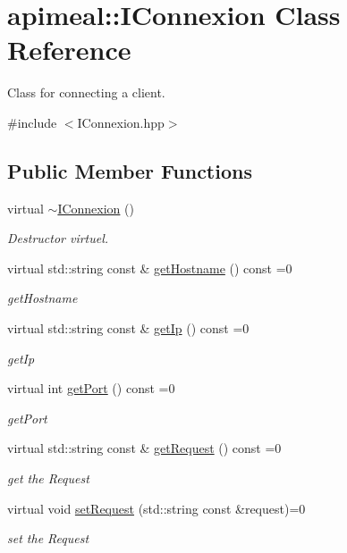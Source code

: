 \hypertarget{classapimeal_1_1IConnexion}{\section{apimeal\-:\-:I\-Connexion Class Reference}
\label{classapimeal_1_1IConnexion}
}


Class for connecting a client.  




{\ttfamily \#include $<$I\-Connexion.\-hpp$>$}

\subsection*{Public Member Functions}
\begin{DoxyCompactItemize}
\item 
\hypertarget{classapimeal_1_1IConnexion_afa1d85aeadc451143eef2837d5ea4939}{virtual \hyperlink{classapimeal_1_1IConnexion_afa1d85aeadc451143eef2837d5ea4939}{$\sim$\-I\-Connexion} ()}\label{classapimeal_1_1IConnexion_afa1d85aeadc451143eef2837d5ea4939}

\begin{DoxyCompactList}\small\item\em Destructor virtuel. \end{DoxyCompactList}\item 
virtual std\-::string const \& \hyperlink{classapimeal_1_1IConnexion_a8ab3c43f9e1356ed9d46a30ff86ee093}{get\-Hostname} () const =0
\begin{DoxyCompactList}\small\item\em get\-Hostname \end{DoxyCompactList}\item 
virtual std\-::string const \& \hyperlink{classapimeal_1_1IConnexion_a6504bb6018c8ddb8cf367384a0b7b178}{get\-Ip} () const =0
\begin{DoxyCompactList}\small\item\em get\-Ip \end{DoxyCompactList}\item 
virtual int \hyperlink{classapimeal_1_1IConnexion_a405c77b84198d491f20e79a0fcb4d133}{get\-Port} () const =0
\begin{DoxyCompactList}\small\item\em get\-Port \end{DoxyCompactList}\item 
virtual std\-::string const \& \hyperlink{classapimeal_1_1IConnexion_ae1a0352ab450dea6afd278385747f750}{get\-Request} () const =0
\begin{DoxyCompactList}\small\item\em get the Request \end{DoxyCompactList}\item 
virtual void \hyperlink{classapimeal_1_1IConnexion_aba7b8303d379e629b59f49621fd6b704}{set\-Request} (std\-::string const \&request)=0
\begin{DoxyCompactList}\small\item\em set the Request \end{DoxyCompactList}\end{DoxyCompactItemize}


